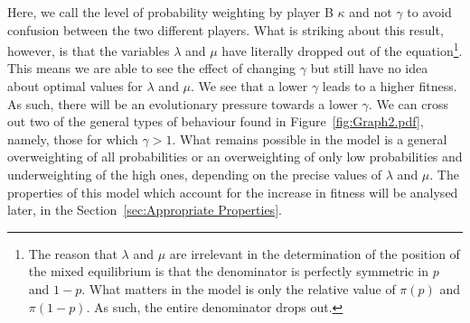 \documentclass[a4paper,10pt]{article}
\numberwithin{equation}{section}
\begin{document}
Here, we call the level of probability weighting by player B $\kappa$ and not $\gamma$ to avoid confusion between the two different players. What is striking about this result, however, is that the variables $\lambda$ and $\mu$ have literally dropped out of the equation\footnote{The reason that $\lambda$ and $\mu$ are irrelevant in the determination of the position of the mixed equilibrium is that the denominator is perfectly symmetric in $p$ and $1-p$. What matters in the model is only the relative value of $\pi(p)$ and $\pi(1-p)$. As such, the entire denominator drops out.}. This means we are able to see the effect of changing $\gamma$ but still have no idea about optimal values for $\lambda$ and $\mu$. We see that a lower $\gamma$ leads to a higher fitness. As such, there will be an evolutionary pressure towards a lower $\gamma$. We can cross out two of the general types of behaviour found in Figure~\ref{fig:Graph2.pdf}, namely, those for which $\gamma>1$. What remains possible in the model is a general overweighting of all probabilities or an overweighting of only low probabilities and underweighting of the high ones, depending on the precise values of $\lambda$ and $\mu$. The properties of this model which account for the increase in fitness will be analysed later, in the Section~\ref{sec:Appropriate Properties}.



 
\end{document}
